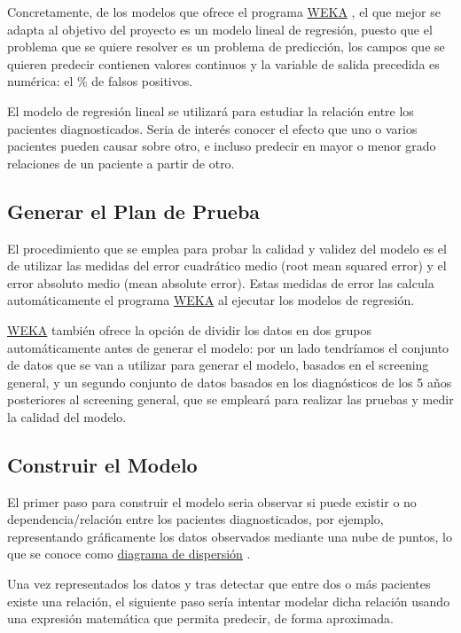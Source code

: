 \documentclass{article}
\begin{document}
Concretamente, de los modelos que ofrece el programa \href{https://www.cs.waikato.ac.nz/~ml/weka/}{WEKA} , el que mejor se adapta al objetivo del proyecto es un modelo lineal de regresión, puesto que el problema que se quiere resolver es un problema de predicción, los campos que se quieren predecir contienen valores continuos y la variable de salida precedida es numérica: el \% de falsos positivos.

El modelo de regresión lineal se utilizará para estudiar la relación entre los pacientes diagnosticados. Seria de interés conocer el efecto que uno o varios pacientes pueden causar sobre otro, e incluso predecir en mayor o menor grado relaciones de un paciente a partir de otro.

\subsection{Generar el Plan de Prueba}\label{Plan de Prueba}
El procedimiento que se emplea para probar la calidad y validez del modelo es el de utilizar las medidas del error cuadrático medio (root mean squared error) y el error absoluto medio (mean absolute error). Estas medidas de error las calcula automáticamente el programa \href{https://www.cs.waikato.ac.nz/~ml/weka/}{WEKA} al ejecutar los modelos de regresión.

\href{https://www.cs.waikato.ac.nz/~ml/weka/}{WEKA} también ofrece la opción de dividir los datos en dos grupos automáticamente antes de generar el modelo: por un lado tendríamos el conjunto de datos que se van a utilizar para generar el modelo, basados en el screening general, y un segundo conjunto de datos basados en los diagnósticos de los 5 años posteriores al screening general, que se empleará para realizar las pruebas y medir la calidad del modelo. 

\subsection{Construir el Modelo}
El primer paso para construir el modelo seria observar si puede existir o no dependencia/relación entre los pacientes diagnosticados, por ejemplo, representando gráficamente los datos observados mediante una nube de puntos, lo que se conoce como \href{https://es.wikipedia.org/wiki/Diagrama_de_dispersi\%C3\%B3n}{diagrama de dispersión} .

Una vez representados los datos y tras detectar que entre dos o más pacientes existe una relación, el siguiente paso sería intentar modelar dicha relación usando una expresión matemática que permita predecir, de forma aproximada.  
\end{document}
